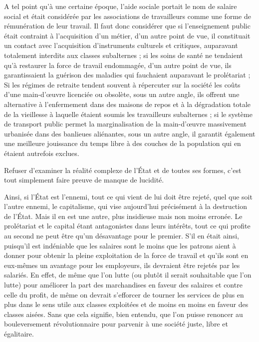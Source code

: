 A tel point qu'à une certaine époque, l'aide sociale portait le nom de salaire social et était considérée par les associations de travailleurs comme une forme de rémunération de leur travail. Il faut donc considérer que si l'enseignement public était contraint à l'acquisition d'un métier, d'un autre point de vue, il constituait un contact avec l'acquisition d'instruments culturels et critiques, auparavant totalement interdits aux classes subalternes ; si les soins de santé ne tendaient qu'à restaurer la force de travail endommagée, d'un autre point de vue, ils garantissaient la guérison des maladies qui fauchaient auparavant le prolétariat ; Si les régimes de retraite tendent souvent à répercuter sur la société les coûts d'une main-d'œuvre licenciée ou obsolète, sous un autre angle, ils offrent une alternative à l'enfermement dans des maisons de repos et à la dégradation totale de la vieillesse à laquelle étaient soumis les travailleurs subalternes ; si le système de transport public permet la marginalisation de la main-d'œuvre massivement urbanisée dans des banlieues aliénantes, sous un autre angle, il garantit également une meilleure jouissance du temps libre à des couches de la population qui en étaient autrefois exclues.

Refuser d'examiner la réalité complexe de l'État et de toutes ses formes, c'est tout simplement faire preuve de manque de lucidité.

Ainsi, si l'État est l'ennemi, tout ce qui vient de lui doit être rejeté, quel que soit l'autre ennemi, le capitalisme, qui vise aujourd'hui précisément à la destruction de l'État. Mais il en est une autre, plus insidieuse mais non moins erronée. Le prolétariat et le capital étant antagonistes dans leurs intérêts, tout ce qui profite au second ne peut être qu'un désavantage pour le premier. S'il en était ainsi, puisqu'il est indéniable que les salaires sont le moins que les patrons aient à donner pour obtenir la pleine exploitation de la force de travail et qu'ils sont en eux-mêmes un avantage pour les employeurs, ils devraient être rejetés par les salariés. En effet, de même que l'on lutte (ou plutôt il serait souhaitable que l'on lutte) pour améliorer la part des marchandises en faveur des salaires et contre celle du profit, de même on devrait s'efforcer de tourner les services de plus en plus dans le sens utile aux classes exploitées et de moins en moins en faveur des classes aisées. Sans que cela signifie, bien entendu, que l'on puisse renoncer au bouleversement révolutionnaire pour parvenir à une société juste, libre et égalitaire.

